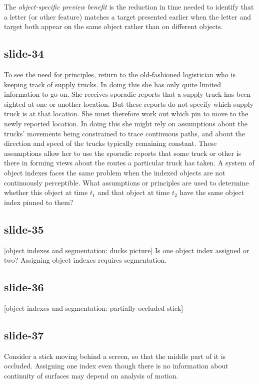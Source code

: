 \documentclass[12pt,\papersize]{extarticle}
\begin{document}
The \emph{object-specific preview benefit} is the reduction in time needed to identify that a
letter (or other feature) matches a target presented earlier when the letter and target both
appear on the same object rather than on different objects.

\subsection{slide-34}
To see the need for principles,
return to the old-fashioned logistician who is keeping track of supply trucks.
In doing this she has only quite limited information to go on.
She receives sporadic reports that a supply truck has been sighted at one or another location.
But these reports do not specify which supply truck is at that location.
She must therefore work out which pin to move to the newly reported location.
In doing this she might rely on assumptions about the trucks’ movements being constrained to trace continuous paths, and about the direction and speed of the trucks typically remaining constant.
These assumptions allow her to use the sporadic reports that some truck or other is there in forming views about the routes a particular truck has taken.
A system of object indexes faces the same problem when the indexed objects are not continuously perceptible.
What assumptions or principles are used to determine whether this object at time $t_1$ and that object at time $t_2$ have the same object index pinned to them?

\subsection{slide-35}
[object indexes and segmentation: ducks picture]
Is one object index assigned or two?
Assigning object indexes requires segmentation.

\subsection{slide-36}
[object indexes and segmentation: partially occluded stick]

\subsection{slide-37}
Consider a stick moving behind a screen, so that the middle part of it is occluded.
Assigning one index even though there is no information about continuity of surfaces
may depend on analysis of motion.
\end{document}
